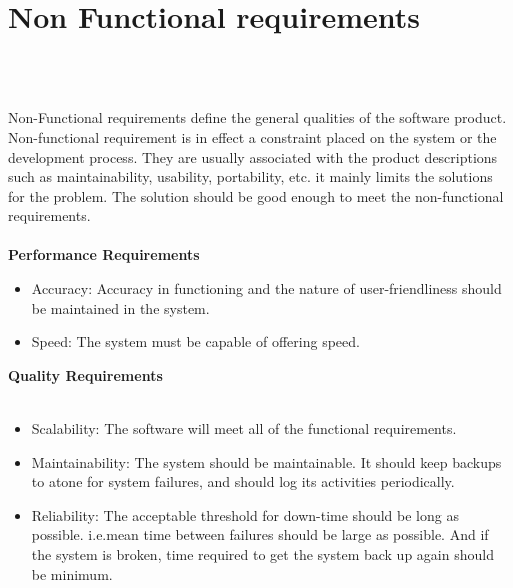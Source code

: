 \section{Non Functional requirements}
\\ \\
\par Non-Functional requirements define the general qualities of the software product. Non-functional requirement is in effect a constraint placed on the system or the development process. They are usually associated with the product descriptions such as maintainability, usability, portability, etc. it mainly limits the solutions for the problem. The solution should be good enough to meet the non-functional requirements.\\ 
\\
\textbf{Performance Requirements}\\
\begin{itemize}
\item Accuracy: Accuracy in functioning and the nature of user-friendliness should be
maintained in the system.\\
\item Speed: The system must be capable of offering speed.\\
\end{itemize}
\newpage
\textbf{Quality Requirements}\\ \\
\begin{itemize}
\item Scalability: The software will meet all of the functional requirements. \\
\item Maintainability: The system should be maintainable. It should keep backups to atone for system failures, and should log its activities periodically. \\
\item Reliability: The acceptable threshold for down-time should be long as possible. i.e.mean time between failures should be large as possible. And if the system is broken,
time required to get the system back up again should be minimum. \\
\end{itemize}
